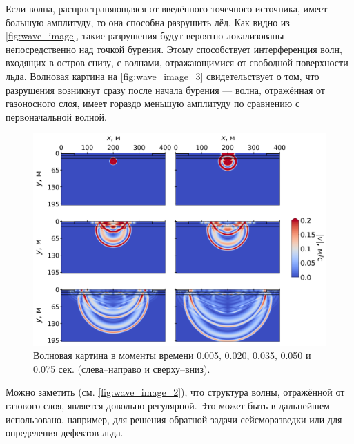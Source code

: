 Если волна, распространяющаяся от введённого точечного источника, имеет большую амплитуду, то она способна разрушить лёд. Как видно из \autoref{fig:wave_image}, такие разрушения будут вероятно локализованы непосредственно над точкой бурения. Этому способствует интерференция волн, входящих в остров снизу, с волнами, отражающимися от свободной поверхности льда. Волновая картина на \autoref{fig:wave_image_3} свидетельствует о том, что разрушения возникнут сразу после начала бурения --- волна, отражённая от газоносного слоя, имеет гораздо меньшую амплитуду по сравнению с первоначальной волной.

\begin{figure}[!h]
    \centering
    \includegraphics[width=\textwidth]{images/gas_field/wave_pic_1.png}
    \caption{Волновая картина в моменты времени 0.005, 0.020, 0.035, 0.050 и 0.075 сек. (слева--направо и сверху--вниз).}
    \label{fig:wave_image}
\end{figure}

Можно заметить (см. \autoref{fig:wave_image_2}), что структура волны, отражённой от газового слоя, является довольно регулярной. Это может быть в дальнейшем использовано, например, для решения обратной задачи сейсморазведки или для определения дефектов льда.


